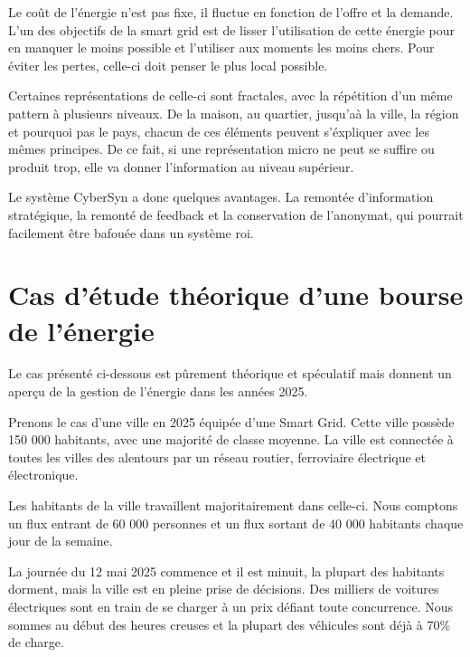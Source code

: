 
Le coût de l'énergie n'est pas fixe, il fluctue en fonction de l'offre et la demande.
L'un des objectifs de la smart grid est de lisser l'utilisation de cette énergie pour
en manquer le moins possible et l'utiliser aux moments les moins chers. Pour éviter les pertes,
celle-ci doit penser le plus local possible.

Certaines représentations de celle-ci sont fractales, avec la répétition d'un même pattern à
plusieurs niveaux.
De la maison, au quartier, jusqu'aà la ville, la région et pourquoi pas le pays, chacun de
ces éléments peuvent s'éxpliquer avec les mêmes principes.
De ce fait, si une représentation micro ne peut se suffire ou produit trop, elle va donner l'information
au niveau supérieur.

Le système CyberSyn a donc quelques avantages.
La remontée d'information stratégique, la remonté de feedback et la conservation de l'anonymat,
qui pourrait facilement être bafouée dans un système roi.

\section{Cas d'étude théorique d'une bourse de l'énergie}

Le cas présenté ci-dessous est pûrement théorique et spéculatif mais donnent un aperçu de
la gestion de l'énergie dans les années 2025.

Prenons le cas d'une ville en 2025 équipée d'une Smart Grid.
Cette ville possède 150 000 habitants, avec une majorité de classe moyenne.
La ville est connectée à toutes les villes des alentours par un réseau routier, ferroviaire
électrique et électronique.

Les habitants de la ville travaillent majoritairement dans celle-ci.
Nous comptons un flux entrant de 60 000 personnes et un flux sortant de 40 000 habitants chaque jour
de la semaine.

La journée du 12 mai 2025 commence et il est minuit, la plupart des habitants dorment, mais
la ville est en pleine prise de décisions.
Des milliers de voitures électriques sont en train de se charger à un prix défiant toute concurrence.
Nous sommes au début des heures creuses et la plupart des véhicules sont déjà à 70\% de charge.

